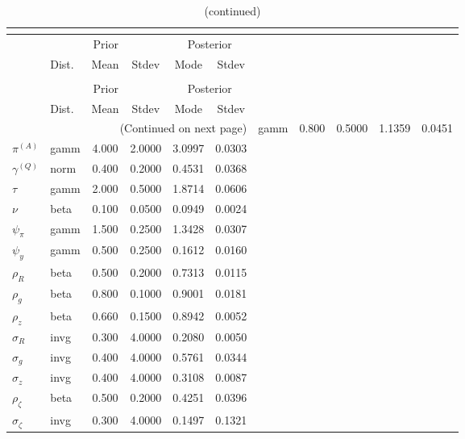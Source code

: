  
\begin{center}
\begin{longtable}{llcccc} 
\caption{Results from posterior maximization (parameters)}\\
 \label{Table:Posterior:1}\\
\toprule 
  & \multicolumn{3}{c}{Prior}  &  \multicolumn{2}{c}{Posterior} \\
  \cmidrule(r{.75em}){2-4} \cmidrule(r{.75em}){5-6}
  & Dist. & Mean  & Stdev & Mode & Stdev \\ 
\midrule \endfirsthead 
\caption{(continued)}\\
 \bottomrule 
  & \multicolumn{3}{c}{Prior}  &  \multicolumn{2}{c}{Posterior} \\
  \cmidrule(r{.75em}){2-4} \cmidrule(r{.75em}){5-6}
  & Dist. & Mean  & Stdev & Mode & Stdev \\ 
\midrule \endhead 
\bottomrule \multicolumn{6}{r}{(Continued on next page)}\endfoot 
\bottomrule\endlastfoot 
${r_{A}}$ & gamm &   0.800 & 0.5000 &   1.1359 &  0.0451 \\ 
${\pi^{(A)}}$ & gamm &   4.000 & 2.0000 &   3.0997 &  0.0303 \\ 
${\gamma^{(Q)}}$ & norm &   0.400 & 0.2000 &   0.4531 &  0.0368 \\ 
${\tau}$ & gamm &   2.000 & 0.5000 &   1.8714 &  0.0606 \\ 
${\nu}$ & beta &   0.100 & 0.0500 &   0.0949 &  0.0024 \\ 
${\psi_\pi}$ & gamm &   1.500 & 0.2500 &   1.3428 &  0.0307 \\ 
${\psi_y}$ & gamm &   0.500 & 0.2500 &   0.1612 &  0.0160 \\ 
${\rho_R}$ & beta &   0.500 & 0.2000 &   0.7313 &  0.0115 \\ 
${\rho_{g}}$ & beta &   0.800 & 0.1000 &   0.9001 &  0.0181 \\ 
${\rho_z}$ & beta &   0.660 & 0.1500 &   0.8942 &  0.0052 \\ 
${\sigma_R}$ & invg &   0.300 & 4.0000 &   0.2080 &  0.0050 \\ 
${\sigma_{g}}$ & invg &   0.400 & 4.0000 &   0.5761 &  0.0344 \\ 
${\sigma_z}$ & invg &   0.400 & 4.0000 &   0.3108 &  0.0087 \\ 
${\rho_\zeta}$ & beta &   0.500 & 0.2000 &   0.4251 &  0.0396 \\ 
${\sigma_\zeta}$ & invg &   0.300 & 4.0000 &   0.1497 &  0.1321 \\ 
\end{longtable}
 \end{center}
